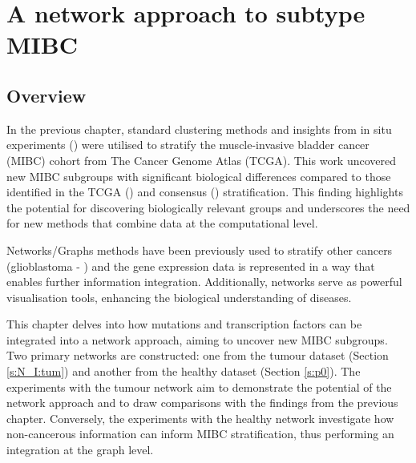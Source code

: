 \section{A network approach to subtype MIBC} \label{s:N_I}


\vspace{3mm}
\vspace{3mm}


\subsection{Overview}

In the previous chapter, standard clustering methods and insights from in situ experiments (\citet{Baker2022-bj}) were utilised to stratify the muscle-invasive bladder cancer (MIBC) cohort from The Cancer Genome Atlas (TCGA). This work uncovered new MIBC subgroups with significant biological differences compared to those identified in the TCGA (\citet{Robertson2017-mg}) and consensus (\citet{Kamoun2020-tj}) stratification. This finding highlights the potential for discovering biologically relevant groups and underscores the need for new methods that combine data at the computational level.

Networks/Graphs methods have been previously used to stratify other cancers (glioblastoma - \citet{Care2019-ij}) and the gene expression data is represented in a way that enables further information integration. Additionally, networks serve as powerful visualisation tools, enhancing the biological understanding of diseases.

This chapter delves into how mutations and transcription factors can be integrated into a network approach, aiming to uncover new MIBC subgroups. Two primary networks are constructed: one from the tumour dataset (Section \ref{s:N_I:tum}) and another from the healthy dataset (Section \ref{s:p0}). The experiments with the tumour network aim to demonstrate the potential of the network approach and to draw comparisons with the findings from the previous chapter. Conversely, the experiments with the healthy network investigate how non-cancerous information can inform MIBC stratification, thus performing an integration at the graph level.

